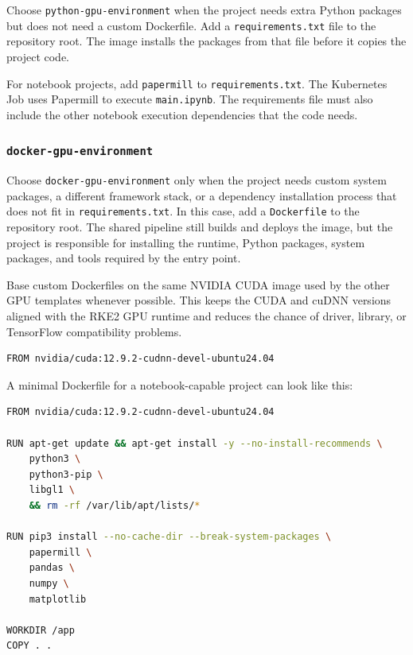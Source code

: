 \documentclass{article}
\begin{document}
Choose \texttt{python-gpu-environment} when the project needs extra Python packages but does not need a custom Dockerfile. Add a \texttt{requirements.txt} file to the repository root. The image installs the packages from that file before it copies the project code.

\vspace{0.5cm}

For notebook projects, add \texttt{papermill} to \texttt{requirements.txt}. The Kubernetes Job uses Papermill to execute \texttt{main.ipynb}. The requirements file must also include the other notebook execution dependencies that the code needs.

\subsubsection{\texttt{docker-gpu-environment}}

Choose \texttt{docker-gpu-environment} only when the project needs custom system packages, a different framework stack, or a dependency installation process that does not fit in \texttt{requirements.txt}. In this case, add a \texttt{Dockerfile} to the repository root. The shared pipeline still builds and deploys the image, but the project is responsible for installing the runtime, Python packages, system packages, and tools required by the entry point.

\vspace{0.5cm}

Base custom Dockerfiles on the same NVIDIA CUDA image used by the other GPU templates whenever possible. This keeps the CUDA and cuDNN versions aligned with the RKE2 GPU runtime and reduces the chance of driver, library, or TensorFlow compatibility problems.

\begin{lstlisting}[language=sh]
FROM nvidia/cuda:12.9.2-cudnn-devel-ubuntu24.04
\end{lstlisting}

A minimal Dockerfile for a notebook-capable project can look like this:

\begin{lstlisting}[language=sh]
FROM nvidia/cuda:12.9.2-cudnn-devel-ubuntu24.04

RUN apt-get update && apt-get install -y --no-install-recommends \
    python3 \
    python3-pip \
    libgl1 \
    && rm -rf /var/lib/apt/lists/*

RUN pip3 install --no-cache-dir --break-system-packages \
    papermill \
    pandas \
    numpy \
    matplotlib

WORKDIR /app
COPY . .
\end{lstlisting}
\end{document}
